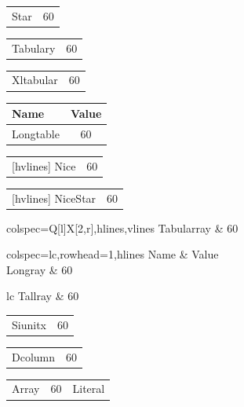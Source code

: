 \documentclass{article}
\newcommand{\revenue}{60}
\begin{document}
\begin{tabular*}{\linewidth}[t]{@{\extracolsep{\fill}}lc}
Star & \revenue \\
\end{tabular*}

\begin{tabulary}{\linewidth}{LJ}
Tabulary & \revenue \\
\end{tabulary}

\begin{xltabular}[l]{\linewidth}{lX}
Xltabular & \revenue \\
\end{xltabular}

\begin{longtable}{lc}
\toprule
Name & Value \\
\endhead
\rowcolor[gray]{0.9}
Longtable & \revenue \\
\bottomrule
\end{longtable}

\begin{NiceTabular}{lc}[hvlines]
Nice & \revenue \\
\end{NiceTabular}

\begin{NiceTabular*}{\linewidth}{lc}[hvlines]
NiceStar & \revenue \\
\end{NiceTabular*}

\begin{tblr}[baseline=T]{colspec={Q[l]X[2,r]},hlines,vlines}
Tabularray & \revenue \\
\end{tblr}

\begin{longtblr}[caption={Example, kept}]{colspec={lc},rowhead=1,hlines}
Name & Value \\
Longray & \revenue \\
\end{longtblr}

\begin{talltblr}{lc}
Tallray & \revenue \\
\end{talltblr}

\begin{tabular}{lS[table-format=2.0]}
Siunitx & \revenue \\
\end{tabular}

\begin{tabular}{lD{.}{.}{2}}
Dcolumn & \revenue \\
\end{tabular}

\begin{tabular}{lw{r}{2cm}W{c}{2cm}}
Array & \revenue & Literal \\
\end{tabular}
\end{document}
